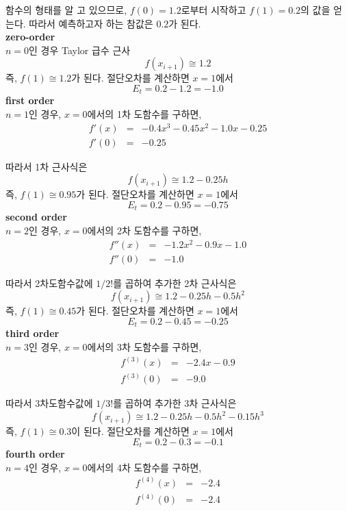 함수의 형태를 알 고 있으므로, $f(0)=1.2$로부터 시작하고 $f(1)=0.2$의 값을 얻는다. 따라서 예측하고자 하는 참값은 $0.2$가 된다.\\
\textbf{zero-order}\\
$n=0$인 경우 Taylor 급수 근사
\begin{displaymath}
f\left(x_{i+1}\right) \cong 1.2
\end{displaymath}
즉, $f(1)\cong 1.2$가 된다. 절단오차를 계산하면 $x=1$에서
\begin{displaymath}
E_{t}=0.2-1.2=-1.0
\end{displaymath}
\textbf{first order}\\
$n=1$인 경우, $x=0$에서의 1차 도함수를 구하면,
\begin{eqnarray*}
f'(x)&=&-0.4x^3-0.45x^2-1.0x-0.25\\
f'(0)&=&-0.25
\end{eqnarray*}

따라서 1차 근사식은
\begin{displaymath}
f\left(x_{i+1}\right) \cong 1.2-0.25h
\end{displaymath}
즉, $f(1)\cong 0.95$가 된다. 절단오차를 계산하면 $x=1$에서
\begin{displaymath}
E_{t}=0.2-0.95=-0.75
\end{displaymath}
\textbf{second order}\\
$n=2$인 경우, $x=0$에서의 2차 도함수를 구하면,
\begin{eqnarray*}
f''(x)&=&-1.2x^2-0.9x-1.0\\
f''(0)&=&-1.0
\end{eqnarray*}

따라서 2차도함수값에 $1/2!$를 곱하여 추가한 2차 근사식은
\begin{displaymath}
f\left(x_{i+1}\right) \cong 1.2-0.25h-0.5h^2
\end{displaymath}
즉, $f(1)\cong 0.45$가 된다. 절단오차를 계산하면 $x=1$에서
\begin{displaymath}
E_{t}=0.2-0.45=-0.25
\end{displaymath}
\textbf{third order}\\
$n=3$인 경우, $x=0$에서의 3차 도함수를 구하면,
\begin{eqnarray*}
f^{(3)}(x)&=&-2.4x-0.9\\
f^{(3)}(0)&=&-9.0
\end{eqnarray*}

따라서 3차도함수값에 $1/3!$를 곱하여 추가한 3차 근사식은
\begin{displaymath}
f\left(x_{i+1}\right) \cong 1.2-0.25h-0.5h^2-0.15h^3
\end{displaymath}
즉, $f(1)\cong 0.3$이 된다. 절단오차를 계산하면 $x=1$에서
\begin{displaymath}
E_{t}=0.2-0.3=-0.1
\end{displaymath}
\textbf{fourth order}\\
$n=4$인 경우, $x=0$에서의 4차 도함수를 구하면,
\begin{eqnarray*}
f^{(4)}(x)&=&-2.4\\
f^{(4)}(0)&=&-2.4
\end{eqnarray*}

